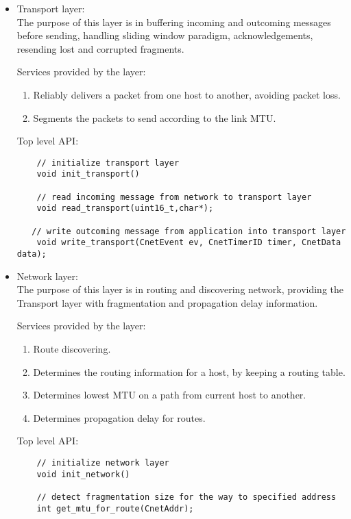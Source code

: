 \documentclass{article}
\begin{document}
\begin{itemize}		
\item	Transport layer: \\
		The purpose of this layer is in buffering incoming and outcoming
		 messages before sending, handling sliding window paradigm, 
		 acknowledgements, resending lost and corrupted fragments.
		
		Services provided by the layer:
    \begin{enumerate}
      \item Reliably delivers a packet from one host to another, avoiding
       packet loss.
      \item Segments the packets to send according to the link MTU.
    \end{enumerate}
		
		Top level API:
  \begin{verbatim}
    // initialize transport layer
    void init_transport()
		
    // read incoming message from network to transport layer
    void read_transport(uint16_t,char*);
    
   // write outcoming message from application into transport layer
	void write_transport(CnetEvent ev, CnetTimerID timer, CnetData data);
	\end{verbatim}	
		
\item Network layer: \\
		The purpose of this layer is in routing and discovering network,
		 providing the Transport layer with fragmentation and propagation
		 delay information.
		
		Services provided by the layer:
    \begin{enumerate}
      \item Route discovering.
      \item Determines the routing information for a host, by keeping a routing
      table.
      \item Determines lowest MTU on a path from current host to another.
      \item Determines propagation delay for routes.
    \end{enumerate}
		
    Top level API:
		
  \begin{verbatim}
    // initialize network layer
    void init_network()	
   		
	// detect fragmentation size for the way to specified address
	int get_mtu_for_route(CnetAddr);
	

\end{verbatim}
\end{itemize}
\end{document}
